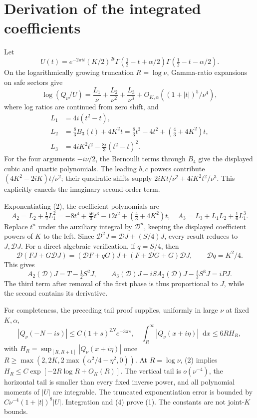 \documentclass[11pt,a4paper]{article}
\newcommand{\dd}{\mathop{}\!\mathrm d}
\newcommand{\D}{\mathcal D}
\begin{document}
\newpage
\section{Derivation of the integrated coefficients}
Let
\[
 U(t)=e^{-2\pi it}(K/2)^{2t}
 \Gamma(\tfrac12-t+\alpha/2)\Gamma(\tfrac12-t-\alpha/2).
\]
On the logarithmically growing truncation \(R=\log\nu\),
Gamma-ratio expansions \cite{gamma} on safe sectors give
\[
 \log(Q_\nu/U)=\frac{L_1}{\nu}+\frac{L_2}{\nu^2}
 +\frac{L_3}{\nu^3}
 +O_{K,\alpha}((1+|t|)^5/\nu^4), \tag{2}
\]
where log ratios are continued from zero shift, and
\begin{align*}
 L_1&=4i(t^2-t),\\
 L_2&=\tfrac83 B_3(t)+4K^2t
     =\tfrac83t^3-4t^2+(\tfrac43+4K^2)t,\\
 L_3&=4iK^2t^2-\tfrac{8i}{3}(t^2-t)^2.
\end{align*}
For the four arguments \(-i\nu/2\), the Bernoulli terms through
\(B_4\) give the displayed cubic and quartic polynomials.
The leading \(b,c\) powers contribute
\((4K^2-2iK)t/\nu^2\); their quadratic shifts supply
\(2iKt/\nu^2+4iK^2t^2/\nu^3\). This explicitly cancels the imaginary
second-order term.

Exponentiating (2), the coefficient polynomials are
\[
 A_2=L_2+\tfrac12L_1^2
 =-8t^4+\tfrac{56}3t^3-12t^2+(\tfrac43+4K^2)t,
 \quad
 A_3=L_3+L_1L_2+\tfrac16L_1^3. \tag{3}
\]
Replace \(t^n\) under the auxiliary integral by \(\D^n\), keeping
the displayed coefficient powers of \(K\) to the left.
Since \(\D^2J=\D J+(S/4)J\), every result reduces to \(J,\D J\).
For a direct algebraic verification, if \(q=S/4\), then
\[
 \D(FJ+G\D J)=(\D F+qG)J+(F+\D G+G)\D J,\qquad
 \D q=K^2/4.
\]
This gives
\[
 A_2(\D)J=T-\tfrac12S^2J,\qquad
 A_3(\D)J-iS A_2(\D)J-\tfrac{i}{3}S^3J=iPJ. \tag{4}
\]
The third term after removal of the first phase is thus proportional
to \(J\), while the second contains its derivative.

For completeness, the preceding tail proof supplies, uniformly in
large \(\nu\) at fixed \(K,\alpha\),
\[
 |Q_\nu(-N-is)|\le C(1+s)^{2N}e^{-3\pi s},\quad
 \int_R^\infty|Q_\nu(x+i\eta)|\dd x\le6RH_R,
\]
with \(H_R=\sup_{[R,R+1]}|Q_\nu(x+i\eta)|\) once
\(R\ge\max(2,2K,2\max(\alpha^2/4-\eta^2,0))\).
At \(R=\log\nu\), (2) implies
\(H_R\le C\exp[-2R\log R+O_K(R)]\).
The vertical tail is \(o(\nu^{-4})\), the horizontal tail is smaller
than every fixed inverse power, and all polynomial moments of
\(|U|\) are integrable. The truncated exponentiation error is
bounded by \(C\nu^{-4}(1+|t|)^8|U|\).
Integration and (4) prove (1). The constants are not joint-\(K\) bounds.
\end{document}
